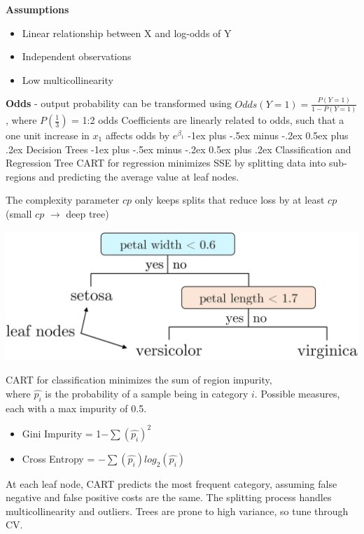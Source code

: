 \documentclass[10pt,landscape]{article}
\makeatletter
\renewcommand{\section}{\@startsection{section}{1}{0mm}%
                                {-1ex plus -.5ex minus -.2ex}%
                                {0.5ex plus .2ex}%
                                {\normalfont\large\bfseries}}
\renewcommand{\subsection}{\@startsection{subsection}{2}{0mm}%
                                {-1ex plus -.5ex minus -.2ex}%
                                {0.5ex plus .2ex}%
                                {\normalfont\normalsize\bfseries}}
\makeatother
\begin{document}
\begin{multicols}{3}
    \textbf{Assumptions}
    \begin{itemize}[label={--},leftmargin=4mm]
        \vspace{-1mm}
        \itemsep -.4mm
        \item Linear relationship between X and log-odds of Y
        \item Independent observations
        \item Low multicollinearity
    \end{itemize}
    \textbf{Odds} - output probability can be transformed using $Odds(Y = 1) = \frac{P(Y=1)}{1-P(Y=1)}$, where $P(\frac{1}{3})$ = 1:2 odds
    Coefficients are linearly related to odds, such that a one unit increase in $x_1$ affects odds by $e^{\beta_1}$
    \vspace{-.5mm}
    \section{Decision Trees}
    \subsection{Classification and Regression Tree}
    CART for regression minimizes SSE by splitting data into sub-regions and predicting the average value at leaf nodes.

    The complexity parameter $cp$ only keeps splits that reduce loss by at least $cp$ (small $cp$ $\to$ deep tree)
    \smallskip
    \begin{center}
        \vspace{-1mm}
        \includegraphics[scale = .08]{images/CART.JPG}
    \end{center}
    \vspace{-2mm}
    CART for classification minimizes the sum of region impurity, \\
    where $\hat{p_i}$ is the probability of a sample being in category $i$.
    Possible measures, each with a max impurity of 0.5.
    \begin{itemize}[label={--},leftmargin=4mm]
        \vspace{-1mm}
        \itemsep -.4mm
        \item Gini Impurity = 1$ - \sum (\hat{p_i})^2$
        \item Cross Entropy = $-\sum (\hat{p_i}) log_2(\hat{p_i})$
    \end{itemize}
    At each leaf node, CART predicts the most frequent category, assuming false negative and false positive costs are the same. The splitting process handles multicollinearity and outliers. Trees are prone to high variance, so tune through CV.


\end{multicols}
\end{document}
